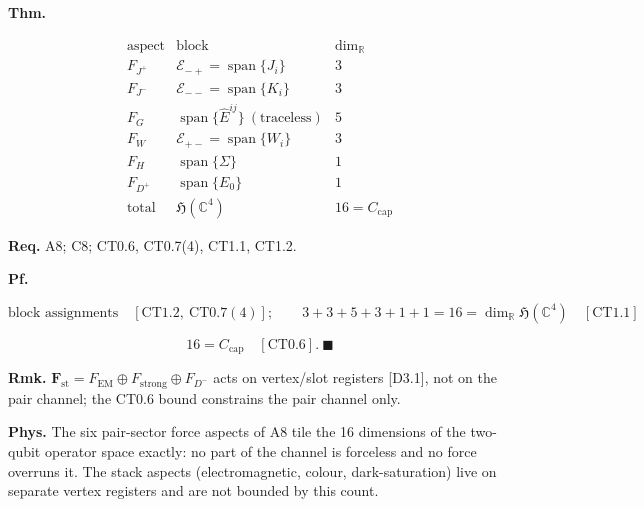 \begin{theorem}\label{tag:CT0-12}
\textbf{Thm.}

\[
\begin{array}{c|c|c}
\text{aspect} & \text{block} & \dim_{\mathbb R}\\ \hline
F_{J^+} & \mathcal E_{-+}=\operatorname{span}\{J_i\} & 3\\
F_{J^-} & \mathcal E_{--}=\operatorname{span}\{K_i\} & 3\\
F_G & \operatorname{span}\{\hat E^{ij}\}\ (\text{traceless}) & 5\\
F_W & \mathcal E_{+-}=\operatorname{span}\{W_i\} & 3\\
F_H & \operatorname{span}\{\Sigma\} & 1\\
F_{D^+} & \operatorname{span}\{E_0\} & 1\\ \hline
\text{total} & \mathfrak H(\mathbb C^4) & 16=C_{\mathrm{cap}}
\end{array}
\]

\textbf{Req.} A8; C8; CT0.6, CT0.7(4), CT1.1, CT1.2.

\textbf{Pf.}

\[
\text{block assignments}\quad[\mathrm{CT1.2},\ \mathrm{CT0.7}(4)];\qquad
3+3+5+3+1+1=16=\dim_{\mathbb R}\mathfrak H(\mathbb C^4)\quad[\mathrm{CT1.1}]
\]

\[
16=C_{\mathrm{cap}}\quad[\mathrm{CT0.6}].\ \blacksquare
\]

\textbf{Rmk.} $\mathbf F_{\mathrm{st}}=F_{\mathrm{EM}}\oplus F_{\mathrm{strong}}\oplus F_{D^-}$ acts on vertex/slot registers [D3.1], not on the pair channel; the CT0.6 bound constrains the pair channel only.

\textbf{Phys.} The six pair-sector force aspects of A8 tile the 16 dimensions of the two-qubit operator space exactly: no part of the channel is forceless and no force overruns it. The stack aspects (electromagnetic, colour, dark-saturation) live on separate vertex registers and are not bounded by this count.

\end{theorem}

